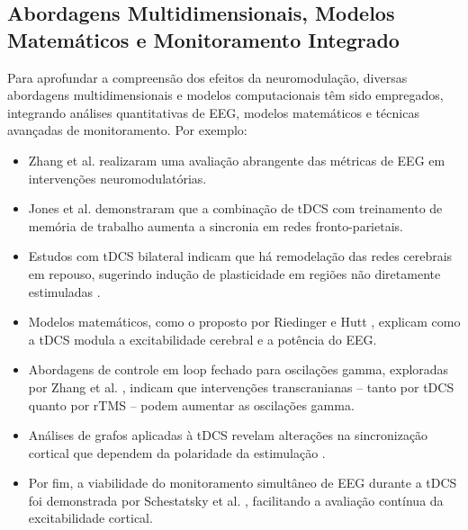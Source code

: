 \subsection{Abordagens Multidimensionais, Modelos Matemáticos e Monitoramento Integrado}
Para aprofundar a compreensão dos efeitos da neuromodulação, diversas abordagens multidimensionais e modelos computacionais têm sido empregados, integrando análises quantitativas de EEG, modelos matemáticos e técnicas avançadas de monitoramento. Por exemplo:
\begin{itemize}
    \item Zhang et al. \cite{zhang2022multidimensional} realizaram uma avaliação abrangente das métricas de EEG em intervenções neuromodulatórias.
    \item Jones et al. \cite{jones2017frontoparietal} demonstraram que a combinação de tDCS com treinamento de memória de trabalho aumenta a sincronia em redes fronto-parietais.
    \item Estudos com tDCS bilateral indicam que há remodelação das redes cerebrais em repouso, sugerindo indução de plasticidade em regiões não diretamente estimuladas \cite{pellegrino2018bilateral}.
    \item Modelos matemáticos, como o proposto por Riedinger e Hutt \cite{riedinger2022model}, explicam como a tDCS modula a excitabilidade cerebral e a potência do EEG.
    \item Abordagens de controle em loop fechado para oscilações gamma, exploradas por Zhang et al. \cite{zhang2024closed}, indicam que intervenções transcranianas – tanto por tDCS quanto por rTMS – podem aumentar as oscilações gamma.
    \item Análises de grafos aplicadas à tDCS revelam alterações na sincronização cortical que dependem da polaridade da estimulação \cite{mancini2016assessing, pellegrino2019transcranial, schollmann2019anodal}.
    \item Por fim, a viabilidade do monitoramento simultâneo de EEG durante a tDCS foi demonstrada por Schestatsky et al. \cite{schesatsky2013simultaneous}, facilitando a avaliação contínua da excitabilidade cortical.
\end{itemize}

